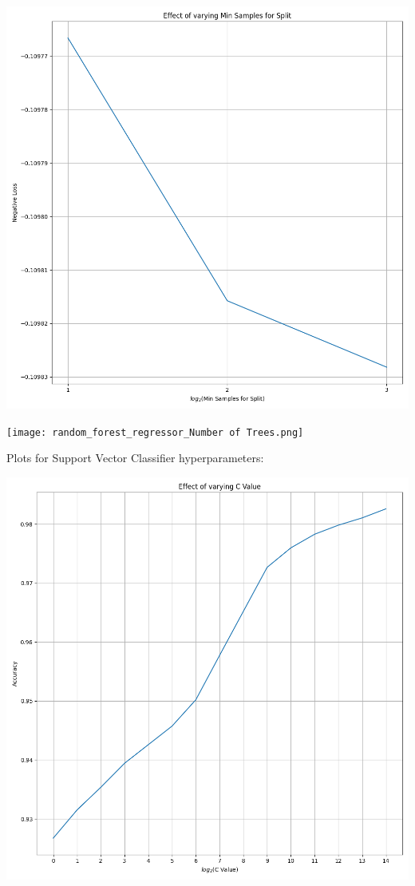 \documentclass[12pt, letterpaper]{article}
\begin{document}
\includegraphics[scale=\myscale]{random_forest_regressor_Min Samples for Split.png}

\texttt{[image: random\_forest\_regressor\_Number of Trees.png]}

Plots for Support Vector Classifier hyperparameters:

\includegraphics[scale=\myscale]{svc_C Value.png}
\end{document}
